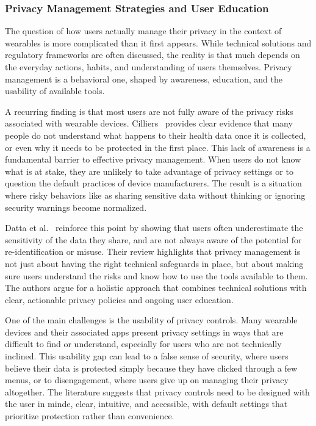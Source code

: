 	\subsubsection{Privacy Management Strategies and User Education}

	The question of how users actually manage their privacy in the context of wearables is more complicated than it first appears. While technical solutions and regulatory frameworks are often discussed, the reality is that much depends on the everyday actions, habits, and understanding of users themselves. Privacy management is a behavioral one, shaped by awareness, education, and the usability of available tools.

	A recurring finding is that most users are not fully aware of the privacy risks associated with wearable devices. Cilliers~\cite{Cilliers2019} provides clear evidence that many people do not understand what happens to their health data once it is collected, or even why it needs to be protected in the first place. This lack of awareness is a fundamental barrier to effective privacy management. When users do not know what is at stake, they are unlikely to take advantage of privacy settings or to question the default practices of device manufacturers. The result is a situation where risky behaviors like as sharing sensitive data without thinking or ignoring security warnings become normalized.

	Datta et al.~\cite{Datta2018} reinforce this point by showing that users often underestimate the sensitivity of the data they share, and are not always aware of the potential for re-identification or misuse. Their review highlights that privacy management is not just about having the right technical safeguards in place, but about making sure users understand the risks and know how to use the tools available to them. The authors argue for a holistic approach that combines technical solutions with clear, actionable privacy policies and ongoing user education. 

	One of the main challenges is the usability of privacy controls. Many wearable devices and their associated apps present privacy settings in ways that are difficult to find or understand, especially for users who are not technically inclined. This usability gap can lead to a false sense of security, where users believe their data is protected simply because they have clicked through a few menus, or to disengagement, where users give up on managing their privacy altogether. The literature suggests that privacy controls need to be designed with the user in minde, clear, intuitive, and accessible, with default settings that prioritize protection rather than convenience.

